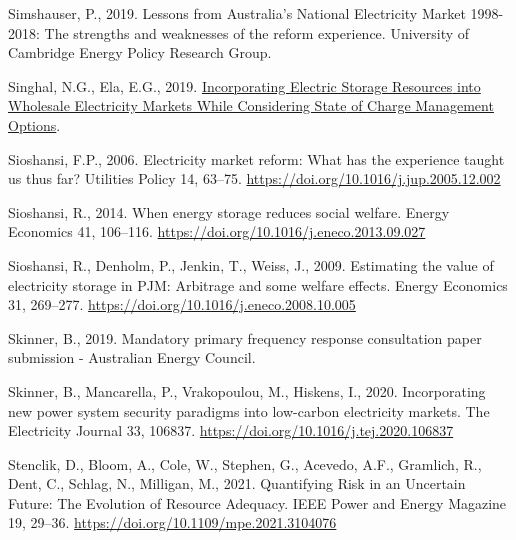 \documentclass[12pt,a4paper,]{report}
\newlength{\cslhangindent}
\newenvironment{CSLReferences}[2] %
 {%
  \setlength{\parindent}{0pt}
  \ifodd #1 \everypar{\setlength{\hangindent}{\cslhangindent}}\ignorespaces\fi
  \ifnum #2 > 0
  \setlength{\parskip}{#2\baselineskip}
  \fi
 }%
 {}
\begin{document}
\begin{CSLReferences}{1}{0}
\leavevmode{}%
Simshauser, P., 2019. Lessons from {Australia}'s {National Electricity
Market} 1998-2018: The strengths and weaknesses of the reform
experience. {University of Cambridge Energy Policy Research Group}.

\leavevmode{}%
Singhal, N.G., Ela, E.G., 2019.
\href{https://cigre-usnc.org/wp-content/uploads/2019/11/3.-GOTF-11042019_EPRI-NS.pdf}{Incorporating
{Electric Storage Resources} into {Wholesale Electricity Markets While
Considering State} of {Charge Management Options}}.

\leavevmode{}%
Sioshansi, F.P., 2006. Electricity market reform: {What} has the
experience taught us thus far? Utilities Policy 14, 63--75.
\url{https://doi.org/10.1016/j.jup.2005.12.002}

\leavevmode{}%
Sioshansi, R., 2014. When energy storage reduces social welfare. Energy
Economics 41, 106--116.
\url{https://doi.org/10.1016/j.eneco.2013.09.027}

\leavevmode{}%
Sioshansi, R., Denholm, P., Jenkin, T., Weiss, J., 2009. Estimating the
value of electricity storage in {PJM}: {Arbitrage} and some welfare
effects. Energy Economics 31, 269--277.
\url{https://doi.org/10.1016/j.eneco.2008.10.005}

\leavevmode{}%
Skinner, B., 2019. Mandatory primary frequency response consultation
paper submission - {Australian Energy Council}.

\leavevmode{}%
Skinner, B., Mancarella, P., Vrakopoulou, M., Hiskens, I., 2020.
Incorporating new power system security paradigms into low-carbon
electricity markets. The Electricity Journal 33, 106837.
\url{https://doi.org/10.1016/j.tej.2020.106837}

\leavevmode{}%
Stenclik, D., Bloom, A., Cole, W., Stephen, G., Acevedo, A.F., Gramlich,
R., Dent, C., Schlag, N., Milligan, M., 2021. Quantifying {Risk} in an
{Uncertain Future}: {The Evolution} of {Resource Adequacy}. IEEE Power
and Energy Magazine 19, 29--36.
\url{https://doi.org/10.1109/mpe.2021.3104076}


\end{CSLReferences}
\end{document}
